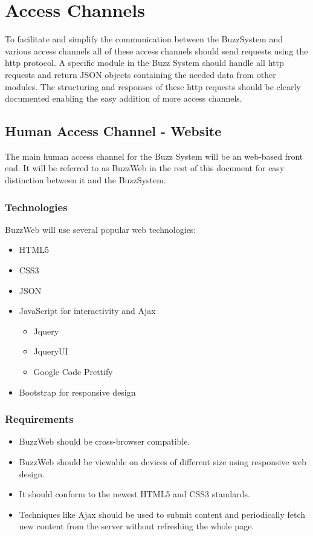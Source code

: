 \section{Access Channels}
To facilitate and simplify the communication between the BuzzSystem and various access channels all of these access channels should send requests using the http protocol. A specific module in the Buzz System should handle all http requests and return JSON objects containing the needed data from other modules. The structuring and responses of these http requests should be clearly documented enabling the easy addition of more access channels.

\subsection{Human Access Channel - Website}
The main human access channel for the Buzz System will be an web-based front end. It will be referred to as BuzzWeb in the rest of this document for easy distinction between it and the BuzzSystem.
	\subsubsection{Technologies}
	BuzzWeb will use several popular web technologies:
	\begin{itemize}
		\item HTML5
		\item CSS3
		\item JSON
		\item JavaScript for interactivity and Ajax
			\begin{itemize}
				\item Jquery
				\item JqueryUI
				\item Google Code Prettify
			\end{itemize}
		\item Bootstrap for responsive design					
	\end{itemize}
	
	\subsubsection{Requirements}
	\begin{itemize}
		\item BuzzWeb should be cross-browser compatible.
		\item BuzzWeb should be viewable on devices of different size using responsive web design.
		\item It should conform to the newest HTML5 and CSS3 standards.
		\item Techniques like Ajax should be used to submit content and periodically fetch new content from the server without refreshing the whole page. 
	\end{itemize}
